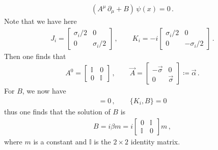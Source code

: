\documentclass[11pt, onesided]{book}
\theoremstyle{break}
\theoremstyle{break}
\newcommand{\pd}{\partial}
\newcommand{\bmat}[1]{\begin{bmatrix} #1 \end{bmatrix}}
\begin{document}
\begin{align*}
(A^\mu \, \pd_\mu + B) \, \psi(x) = 0\,.
\end{align*}
Note that we have here
\begin{align*}
J_i = \bmat{\sigma_i/2 & 0 \\ 0 & \sigma_i/2}\,,\qquad
K_i = -i \bmat{\sigma_i/2 & 0 \\ 0 & -\sigma_i/2}\,.
\end{align*}
Then one finds that
\begin{align*}
A^0 = \bmat{\mathbb{I} & 0 \\ 0 & \mathbb{I}}\,, \qquad \vec{A} = \bmat{-\vec{\sigma} & 0 \\ 0 & \vec{\sigma}} \coloneqq \vec{\alpha}\,.
\end{align*}
For $B$, we now have
\begin{align*}
[J_i, B] = 0\,,\qquad\{K_i, B\} = 0
\end{align*}
thus one finds that the solution of $B$ is 
\begin{align*}
B = i\beta m = i \bmat{0 & \mathbb{I} \\ \mathbb{I}& 0} m\,,
\end{align*}
where $m$ is a constant and $\mathbb{I}$ is the $2\times 2$ identity matrix. \\
\end{document}
